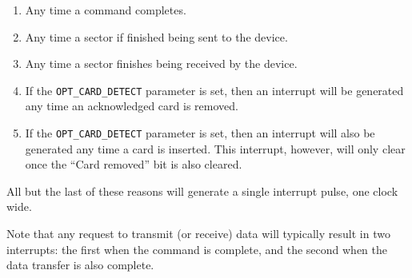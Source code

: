 \documentclass{gqtekspec}
\begin{document}
\begin{table}
\begin{table}
\begin{table}
\begin{table}
\begin{table}
\begin{table}
\begin{enumerate}
\item Any time a command completes.
\item Any time a sector if finished being sent to the device.
\item Any time a sector finishes being received by the device.
\item If the {\tt OPT\_CARD\_DETECT} parameter is set, then an interrupt
	will be generated any time an acknowledged card is removed.
\item If the {\tt OPT\_CARD\_DETECT} parameter is set, then an interrupt will
	also be generated any time a card is inserted.  This
	interrupt, however, will only clear once the ``Card removed'' bit is
	also cleared.
\end{enumerate}

All but the last of these reasons will generate a single interrupt pulse,
one clock wide.

Note that any request to transmit (or receive) data will typically result in
two interrupts: the first when the command is complete, and the second when
the data transfer is also complete.


\end{table}
\end{table}
\end{table}
\end{table}
\end{table}
\end{table}
\end{document}
